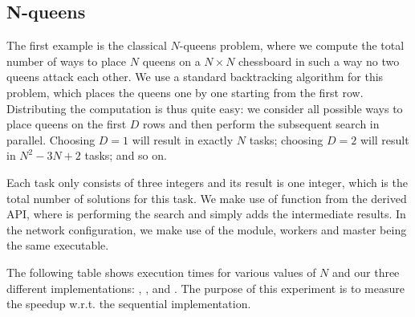 \documentclass{llncs}
\begin{document}
\subsection{N-queens}\label{sec:n-queens}

The first example is the classical $N$-queens problem, where we
compute the total number of ways to place $N$ queens on a $N\times N$
chessboard in such a way no two queens attack each other.
We use a standard backtracking algorithm for this problem, which
places the queens one by one starting from the first row.
Distributing the computation is thus quite easy: we consider all
possible ways to place queens on the first $D$ rows and then perform
the subsequent search in parallel. Choosing $D=1$ will result in
exactly $N$ tasks; choosing $D=2$ will result in $N^2-3N+2$ tasks; and
so on.

Each task only consists of three integers and its result is one integer,
which is the total number of solutions for this task.
We make use of function  from the derived API,
where  is performing the search and  simply adds the
intermediate results.
In the network configuration, we make use of the 
module, workers and master being the same executable.

The following table shows execution times for various values of $N$
and our three different implementations: , , and
. The purpose of this experiment is to measure the speedup
w.r.t. the sequential implementation.
\end{document}
